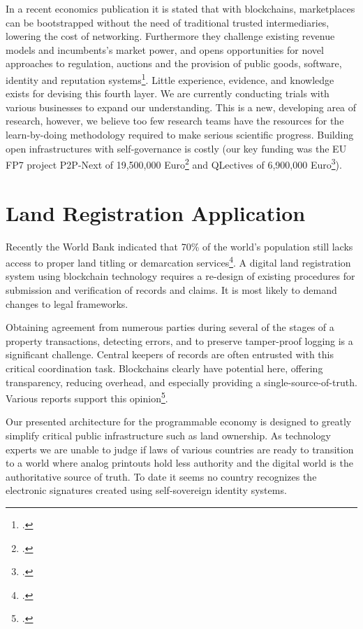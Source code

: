 \documentclass[USenglish]{article}
\begin{document}
In a recent economics publication it is stated that with blockchains, marketplaces can be bootstrapped without the need of traditional trusted intermediaries, lowering the cost of networking.
Furthermore they challenge existing revenue models and incumbents's market power, and opens opportunities for novel approaches to regulation, auctions and the provision of public goods, software, identity and reputation systems\footcite{catalini2016some}.
Little experience, evidence, and knowledge exists for devising this fourth layer.
We are currently conducting trials with various businesses to expand our understanding.
This is a new, developing area of research, however, we believe too few research teams have the resources for the learn-by-doing methodology required to make serious scientific progress.
Building open infrastructures with self-governance is costly (our key funding was the EU FP7 project P2P-Next of 19,500,000 Euro\footcite{p2pnextfunding} and QLectives of 6,900,000 Euro\footcite{qlectivefunding}).

\section{Land Registration Application}

Recently the World Bank indicated that 70\% of the world’s population still lacks access to proper land titling or demarcation services\footcite{ieglandadministration}.
A digital land registration system using blockchain technology requires a re-design of existing procedures for submission and verification of records and claims.
It is most likely to demand changes to legal frameworks.

Obtaining agreement from numerous parties during several of the stages of a property transactions, detecting errors, and to preserve tamper-proof logging is a significant challenge.
Central keepers of records are often entrusted with this critical coordination task.
Blockchains clearly have potential here, offering transparency, reducing overhead, and especially providing a single-source-of-truth.
Various reports support this opinion\footcite{deloitteblockchain}.

Our presented architecture for the programmable economy is designed to greatly simplify critical public infrastructure such as land ownership.
As technology experts we are unable to judge if laws of various countries are ready to transition to a world where analog printouts hold less authority and the digital world is the authoritative source of truth.
To date it seems no country recognizes the electronic signatures created using self-sovereign identity systems.
\end{document}
